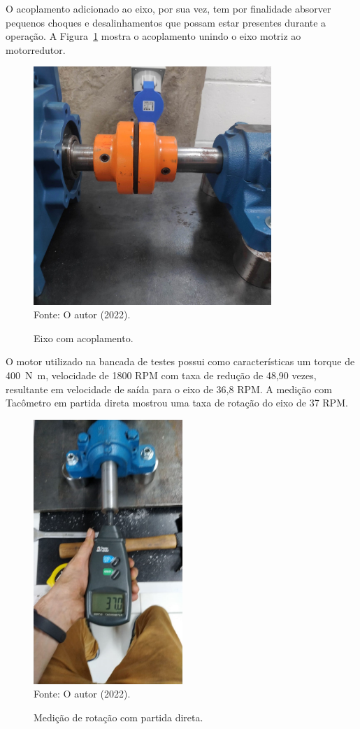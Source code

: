 \documentclass[
	12pt,				
	oneside,			
	a4paper,			
	english,			
	brazil,	
	sumario=abnt-6027-2012		
	]{abntex2ppgsi}
\begin{document}
O acoplamento adicionado ao eixo, por sua vez, tem por finalidade absorver pequenos choques e desalinhamentos que possam estar presentes durante a operação. A Figura~\ref{acoplamento_eixo} mostra o acoplamento unindo o eixo motriz ao motorredutor. 

\begin{figure}[H]
\centering
\caption {Eixo com acoplamento.} 
\includegraphics[width=\textwidth,height=90mm,keepaspectratio]{acoplamento_eixo} \\
Fonte: O autor (2022).
\label{acoplamento_eixo}
\end{figure}
 
O motor utilizado na bancada de testes possui como características um torque de \SI{400}{\newton\metre}, velocidade de 1800 RPM com taxa de redução de 48,90 vezes, resultante em velocidade de saída para o eixo de 36,8 RPM. A medição com Tacômetro em partida direta mostrou uma taxa de rotação do eixo de 37 RPM. 

\begin{figure}[H]
\centering
\caption {Medição de rotação com partida direta.}
\includegraphics[width=\textwidth,height=100mm,keepaspectratio]{tacometro_lucas} \\
Fonte: O autor (2022).
\label{tacometro_lucas}
\end{figure}
 
\end{document}
